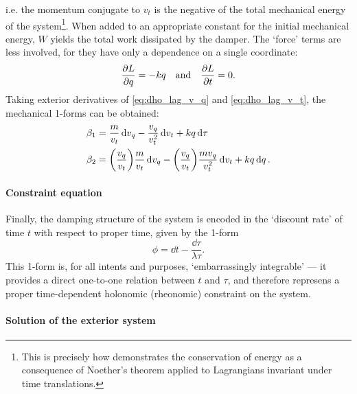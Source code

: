     i.e. the momentum conjugate to $v_t$ is the negative of the total mechanical energy of the system\footnote{This is precisely how \citet{Arnold1989} demonstrates the conservation of energy as a consequence of Noether's theorem applied to Lagrangians invariant under time translations.}. When added to an appropriate constant for the initial mechanical energy, $W$ yields the total work dissipated by the damper. The `force' terms are less involved, for they have only a dependence on a single coordinate:
    \begin{equation}
        \pdv{L}{q} = -kq \quad\text{and}\quad \pdv{L}{t} = 0. 
        \label{eq:dho_lag_force}
    \end{equation}
    Taking exterior derivatives of \cref{eq:dho_lag_v_q} and \cref{eq:dho_lag_v_t}, the mechanical 1-forms can be obtained:
    \begin{equation}
        \begin{split}
            \beta_1 &= \frac{m}{v_t}\dd{v_q} - \frac{v_q}{v_t^2}\dd{v_t} + kq\dd{\tau} \\
            \beta_2 &= \qty(\frac{v_q}{v_t})\frac{m}{v_t}\dd{v_q} - \qty(\frac{v_q}{v_t})\frac{m v_q}{v_t^2}\dd{v_t} + kq\dd{q}.
        \end{split}
    \end{equation}

\paragraph{Constraint equation}
Finally, the damping structure of the system is encoded in the `discount rate' of time $t$ with respect to proper time, given by the 1-form
    \begin{equation}
        \phi = \dd{t} - \frac{\dd{\tau}}{\lambda \tau}.     
    \end{equation}
This 1-form is, for all intents and purposes, `embarrassingly integrable' --- it provides a direct one-to-one relation between $t$ and $\tau$, and therefore represens a proper time-dependent holonomic (rheonomic) constraint on the system.

\paragraph{Solution of the exterior system}

